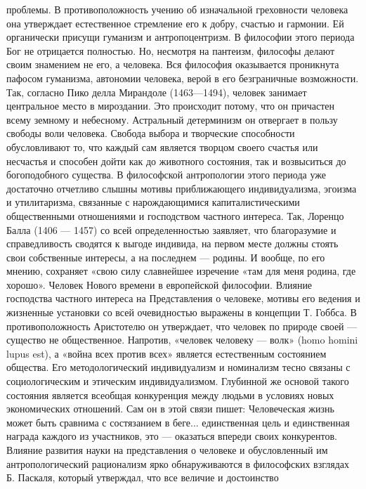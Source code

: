 \documentclass[12pt]{article}
\begin{document}
проблемы. В противоположность учению об изначальной греховности человека она утверждает естественное
стремление  его  к  добру,  счастью  и  гармонии.  Ей  органически  присущи  гуманизм  и  антропоцентризм.  В
философии этого периода Бог не отрицается полностью. Но, несмотря на пантеизм, философы делают своим
знамением  не  его,  а  человека.  Вся  философия  оказывается  проникнута  пафосом  гуманизма,  автономии
человека, верой в его безграничные возможности.
Так, согласно Пико делла Мирандоле (1463—1494), человек занимает центральное место в мироздании. Это
происходит потому, что он причастен всему земному и небесному. Астральный детерминизм он отвергает в
пользу свободы воли человека. Свобода выбора и творческие способности обусловливают то, что каждый сам
является  творцом  своего  счастья  или  несчастья  и  способен  дойти  как  до  животного  состояния,  так  и
возвыситься до богоподобного существа.
В  философской  антропологии  этого  периода  уже  достаточно  отчетливо  слышны  мотивы  приближающего
индивидуализма, эгоизма и утилитаризма, связанные с нарождающимися капиталистическими общественными
отношениями и господством частного интереса. Так, Лоренцо Балла (1406 — 1457) со всей определенностью
заявляет, что благоразумие и справедливость сводятся к выгоде индивида, на первом месте должны стоять свои
собственные интересы, а на последнем — родины. И вообще, по его мнению, сохраняет «свою силу славнейшее
изречение «там для меня родина, где хорошо».
Человек Нового времени в европейской философии.
Влияние  господства  частного  интереса  на  Представления  о  человеке,  мотивы  его  ведения  и  жизненные
установки  со всей  очевидностью  выражены в  концепции  Т.  Гоббса.  В противоположность  Аристотелю он
утверждает, что человек по природе своей — существо не общественное. Напротив, «человек человеку — волк»
(homo  homini  lupus  est),  а  «война  всех  против  всех»  является  естественным  состоянием  общества.  Его
методологический  индивидуализм  и  номинализм  тесно  связаны  с  социологическим  и  этическим
индивидуализмом. Глубинной же основой такого состояния является всеобщая конкуренция между людьми в
условиях новых экономических отношений. Сам он в этой связи пишет:
Человеческая жизнь может быть сравнима с состязанием в беге... единственная цель и единственная награда
каждого из участников, это — оказаться впереди своих конкурентов.
Влияние развития науки на представления о человеке и обусловленный им антропологический рационализм
ярко обнаруживаются в философских взглядах Б. Паскаля, который утверждал, что все величие и достоинство
\end{document}
